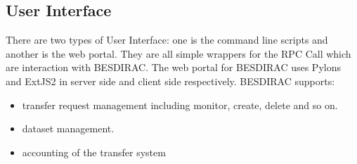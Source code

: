 \subsection{User Interface}
There are two types of User Interface: one is the command line scripts and 
another is the web portal. 
They are all simple wrappers for the RPC Call which are interaction
with BESDIRAC.
The web portal for BESDIRAC uses Pylons and ExtJS2 in server side and
client side respectively. BESDIRAC supports:
\begin{itemize}
    \item transfer request management including monitor, create, delete
          and so on.
    \item dataset management.
    \item accounting of the transfer system
\end{itemize}
